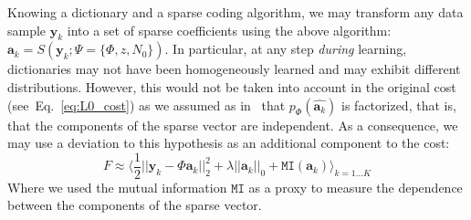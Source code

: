 \documentclass[letterpaper,final,conference,10pt]{IEEEtran}
\newcommand{\citep}[1]{\cite{#1}}
\newcommand{\coef}{\mathbf{a}} %
\newcommand{\image}{\mathbf{y}} %
\newcommand{\dico}{\Phi} %
\newcommand{\norm}[1]{|\!| #1 |\!|}
\newcommand{\seeEq}[1]{Eq.~\ref{eq:#1}}%
\begin{document}
\begin{figure}
{%
\label{fig:HEH}}%
\end{figure}%
Knowing a dictionary and a sparse coding algorithm, we may transform any data sample $\image_k$ into a set of sparse coefficients using the above algorithm: $\coef_{k} = S(\image_k; \Psi=\{\dico, z, N_0\})$. In particular, at any step \emph{during} learning, dictionaries may not have been homogeneously learned and may exhibit different distributions. %
However, this would not be taken into account in the original cost (see~\seeEq{L0_cost}) as we assumed as in~\cite{Olshausen97} that $p_\dico(\hat{\coef_{k}})$ is factorized, that is, that the components of the sparse vector are independent. As a consequence, we may use a deviation to this hypothesis as an additional component to the cost: 
\begin{equation}%
F \approx  \langle \frac{1}{2} \norm{\image_k - \dico \coef_{k}}_2^2 + \lambda\norm{\coef_{k}}_0 + \texttt{MI}(\coef_{k}) \rangle_{k = 1 \ldots K}%
\label{eq:L0_cost_full}%
\end{equation}%
Where we used the mutual information $\texttt{MI}$ as a proxy to measure the dependence between the components of the sparse vector. %
\end{document}
